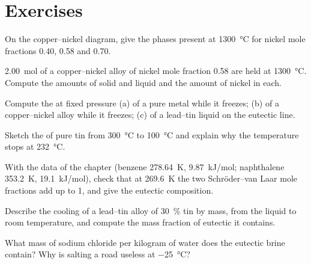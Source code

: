 \section{Exercises}

\begin{exercise}[$\star$]\label{exo:b2:solid-liquid-diagrams:1}
On the copper--nickel diagram, give the phases present at
\qty{1300}{\degreeCelsius} for nickel mole fractions 0.40, 0.58 and 0.70.
\end{exercise}

\begin{exercise}[$\star$]\label{exo:b2:solid-liquid-diagrams:2}
\qty{2.00}{mol} of a copper--nickel alloy of nickel mole fraction 0.58 are held
at \qty{1300}{\degreeCelsius}. Compute the amounts of solid and liquid and the
amount of nickel in each.
\end{exercise}

\begin{exercise}[$\star$]\label{exo:b2:solid-liquid-diagrams:3}
Compute the  at fixed pressure (a) of a pure metal while it freezes;
(b) of a copper--nickel alloy while it freezes; (c) of a lead--tin liquid on the
eutectic line.
\end{exercise}

\begin{exercise}[$\star$]\label{exo:b2:solid-liquid-diagrams:4}
Sketch the  of pure tin from \qty{300}{\degreeCelsius} to
\qty{100}{\degreeCelsius} and explain why the temperature stops at
\qty{232}{\degreeCelsius}.
\end{exercise}

\begin{exercise}[$\star\star$]\label{exo:b2:solid-liquid-diagrams:5}
With the data of the chapter (benzene \qty{278.64}{K}, \qty{9.87}{kJ/mol};
naphthalene \qty{353.2}{K}, \qty{19.1}{kJ/mol}), check that at
\qty{269.6}{K} the two Schröder--van Laar mole fractions add up to 1, and give
the eutectic composition.
\end{exercise}

\begin{exercise}[$\star\star$]\label{exo:b2:solid-liquid-diagrams:6}
Describe the cooling of a lead--tin alloy of 30~\% tin by mass, from the liquid
to room temperature, and compute the mass fraction of eutectic it contains.
\end{exercise}

\begin{exercise}[$\star\star$]\label{exo:b2:solid-liquid-diagrams:7}
What mass of sodium chloride per kilogram of water does the eutectic brine
contain? Why is salting a road useless at \qty{-25}{\degreeCelsius}?
\end{exercise}


